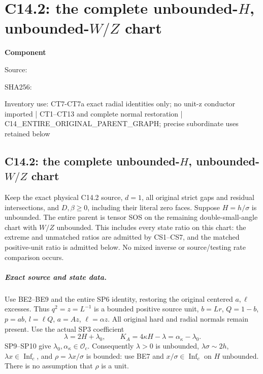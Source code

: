 \chapter{C14.2: the complete unbounded-$H$, unbounded-$W/Z$ chart}
\label{component:p831dd6874dcf}
\noindent\textbf{Component }\par
{\small\noindent Source: \par}
{\small\noindent SHA256: \par}
{\small\noindent Inventory use: CT7-CT7a exact radial identities only; no unit-z conductor imported | CT1--CT13 and complete normal restoration | C14\_\allowbreak{}ENTIRE\_\allowbreak{}ORIGINAL\_\allowbreak{}PARENT\_\allowbreak{}GRAPH; precise subordinate uses retained below\par}
\medskip
\section{C14.2: the complete unbounded-$H$, unbounded-$W/Z$ chart}

\begin{proposition}
Keep the exact physical C14.2 source, $d=1$, all original strict
gaps and residual intersections, and $D,\beta\ge0$, including their
literal zero faces.  Suppose $H=h/\sigma$ is unbounded.  The entire
parent is tensor SOS on the remaining double-small-angle chart with
$W/Z$ unbounded.  This includes every state ratio on this chart:
the extreme and unmatched ratios are admitted by CS1--CS7, and the
matched positive-unit ratio is admitted below.  No mixed inverse or
source/testing rate comparison occurs.
\end{proposition}

\paragraph{Exact source and state data.}
Use BE2--BE9 and the entire SP6 identity, restoring the original
centered $a,\ell$ excesses.  Thus $q^2=z=L^{-1}$ is a bounded
positive source unit, $b=Lr$, $Q=1-b$, $p=ab$, $l=\ell Q$,
$a=Az$, $\ell=\alpha z$.  All original hard and radial normals
remain present.  Use the actual SP3 coefficient
\[
 \lambda=2H+\lambda_0,
 \qquad K_A=4\kappa H-\lambda=\alpha_\kappa-\lambda_0.
                                                               \tag{CT1}
\]
SP9--SP10 give $\lambda_0,\alpha_\kappa\in\mathcal O_c$.
Consequently $\lambda>0$ is unbounded, $\lambda\sigma\sim2h$,
$\lambda x\in\operatorname{Inf}_c$, and
$\rho=\lambda x/\sigma$ is bounded: use BE7 and
$x/\sigma\in\operatorname{Inf}_c$ on $H$ unbounded.
There is no assumption that $\rho$ is a unit.

